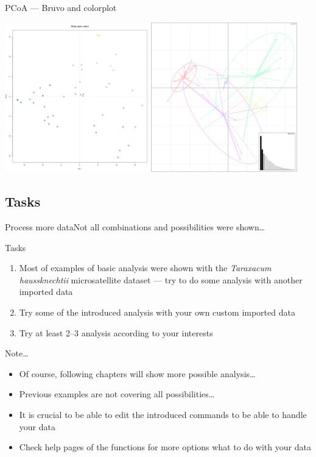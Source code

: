\documentclass[compress, xelatex, 11pt, xcolor=svgnames, aspectratio=169,
	hyperref={
		bookmarks=true,
		unicode=true,
		colorlinks=true,
		pdftitle={Molecular data in R},
		plainpages=false,
		pdfauthor={Vojtech Zeisek},
		pdfsubject={Course about phylogeny and evolution in R},
		pdfcreator={XeLaTeX},
		pdfkeywords={R, evolution, phylogeny, molecular data},
		linkcolor=Crimson, %
		anchorcolor=Magenta, %
		citecolor=Magenta, %
		filecolor=Magenta, %
		menucolor=Magenta, %
		urlcolor=DodgerBlue, %
		},
	url={hyphens, lowtilde} %
	]{beamer}
\begin{document}
\begin{frame}{PCoA --- Bruvo and colorplot}
	\begin{center}
		\includegraphics[height=6.5cm]{pcoa-dalsi.png}
	\end{center}
\end{frame}

\subsection{Tasks}

\begin{frame}{Process more data}{Not all combinations and possibilities were shown\ldots}
	\begin{exampleblock}{Tasks}
		\begin{enumerate}
			\item Most of examples of basic analysis were shown with the \textit{Taraxacum haussknechtii} microsatellite dataset --- try to do some analysis with another imported data
			\item Try some of the introduced analysis with your own custom imported data
			\item Try at least 2--3 analysis according to your interests
		\end{enumerate}
	\end{exampleblock}
	\begin{block}{Note\ldots}
		\begin{itemize}
			\item Of course, following chapters will show more possible analysis\ldots
			\item Previous examples are not covering all possibilities\ldots
			\item It is crucial to be able to edit the introduced commands to be able to handle your data
			\item Check help pages of the functions for more options what to do with your data
		\end{itemize}
	\end{block}
\end{frame}
\end{document}
